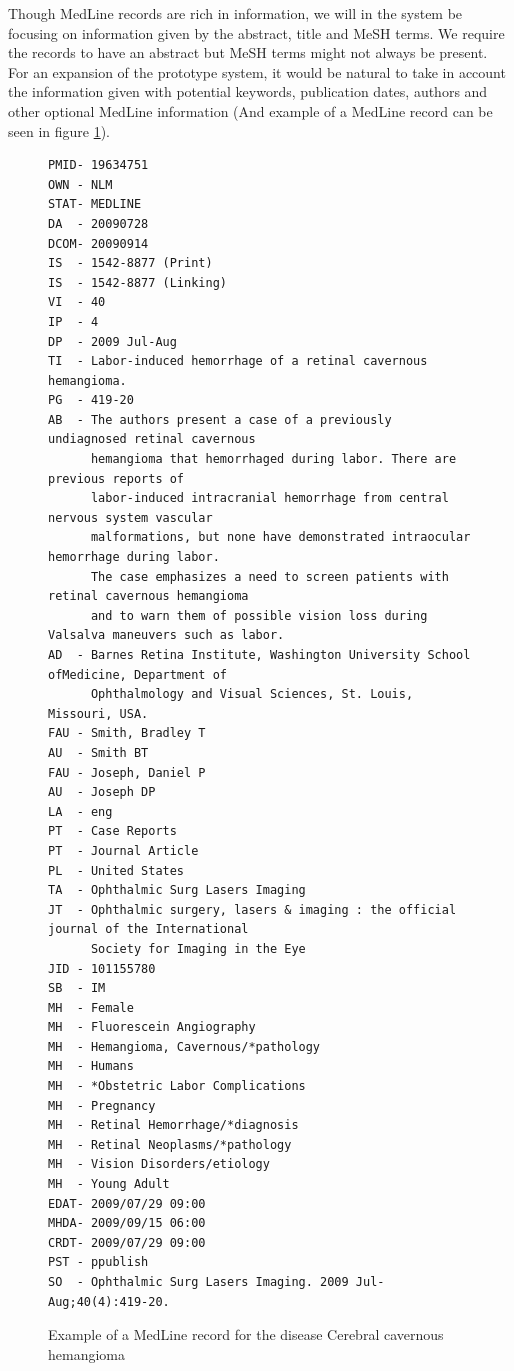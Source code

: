 Though MedLine records are rich in information, we will in the system
be focusing on information given by the abstract, title and MeSH
terms. We require the records to have an abstract but MeSH terms might
not always be present. For an expansion of the prototype system, it
would be natural to take in account the information given with
potential keywords, publication dates, authors and other optional
MedLine information (And example of a MedLine record can be seen in figure \ref{MedLineRecord}).

\begin{figure}[H]
  \caption{Example of a MedLine record for the disease Cerebral cavernous hemangioma}
  \scriptsize{
  \begin{verbatim}
PMID- 19634751
OWN - NLM
STAT- MEDLINE
DA  - 20090728
DCOM- 20090914
IS  - 1542-8877 (Print)
IS  - 1542-8877 (Linking)
VI  - 40
IP  - 4
DP  - 2009 Jul-Aug
TI  - Labor-induced hemorrhage of a retinal cavernous hemangioma.
PG  - 419-20
AB  - The authors present a case of a previously undiagnosed retinal cavernous
      hemangioma that hemorrhaged during labor. There are previous reports of
      labor-induced intracranial hemorrhage from central nervous system vascular
      malformations, but none have demonstrated intraocular hemorrhage during labor.
      The case emphasizes a need to screen patients with retinal cavernous hemangioma
      and to warn them of possible vision loss during Valsalva maneuvers such as labor.
AD  - Barnes Retina Institute, Washington University School ofMedicine, Department of
      Ophthalmology and Visual Sciences, St. Louis, Missouri, USA.
FAU - Smith, Bradley T
AU  - Smith BT
FAU - Joseph, Daniel P
AU  - Joseph DP
LA  - eng
PT  - Case Reports
PT  - Journal Article
PL  - United States
TA  - Ophthalmic Surg Lasers Imaging
JT  - Ophthalmic surgery, lasers & imaging : the official journal of the International 
      Society for Imaging in the Eye
JID - 101155780
SB  - IM
MH  - Female
MH  - Fluorescein Angiography
MH  - Hemangioma, Cavernous/*pathology
MH  - Humans
MH  - *Obstetric Labor Complications
MH  - Pregnancy
MH  - Retinal Hemorrhage/*diagnosis
MH  - Retinal Neoplasms/*pathology
MH  - Vision Disorders/etiology
MH  - Young Adult
EDAT- 2009/07/29 09:00
MHDA- 2009/09/15 06:00
CRDT- 2009/07/29 09:00
PST - ppublish
SO  - Ophthalmic Surg Lasers Imaging. 2009 Jul-Aug;40(4):419-20.

  \end{verbatim}
  }
  \label{MedLineRecord}
\end{figure}

